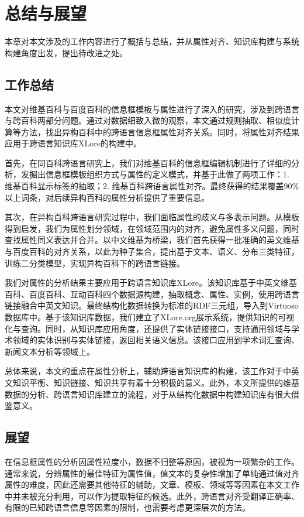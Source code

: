 \chapter{总结与展望}
\label{cha:conclusion}
本章对本文涉及的工作内容进行了概括与总结，并从属性对齐、知识库构建与系统构建角度出发，提出待改进之处。

\section{工作总结}
本文对维基百科与百度百科的信息框模板与属性进行了深入的研究，涉及到跨语言与跨百科两部分问题。通过对数据细致入微的观察，本文通过规则抽取、相似度计算等方法，找出异构百科中的跨语言信息框属性对齐关系。同时，将属性对齐结果应用于跨语言知识库XLore的构建中。

首先，在同百科跨语言研究上，我们对维基百科的信息框编辑机制进行了详细的分析，发掘出信息框模板组织方式与属性的定义模式，并基于此做了两项工作：1. 维基百科显示标签的抽取；2. 维基百科跨语言属性对齐。最终获得的结果覆盖90\%以上词条，对后续异构百科的属性分析提供了重要信息。

其次，在异构百科跨语言研究过程中，我们面临属性的歧义与多表示问题。从模板得到启发，我们为属性划分领域，在领域范围内的对齐，避免属性多义问题，同时查找属性同义表达并合并。以中文维基为桥梁，我们首先获得一批准确的英文维基与百度百科的对齐关系，以此为种子集合，提出基于文本、语义、分布三类特征，训练二分类模型，实现异构百科下的跨语言链接。

我们对属性的分析结果主要应用于跨语言知识库XLore。该知识库基于中英文维基百科、百度百科、互动百科四个数据源构建，抽取概念、属性、实例，使用跨语言链接融合中英文知识。最终结构化数据转换为标准的RDF三元组，导入到Virtuoso数据库中。基于该知识库数据，我们建立了XLore.org展示系统，提供知识的可视化与查询。同时，从知识库应用角度，还提供了实体链接接口，支持通用领域与学术领域的实体识别与实体链接，返回相关语义信息。该接口应用到学术词汇查询、新闻文本分析等领域上。

总体来说，本文的重点在属性分析上，辅助跨语言知识库的构建，该工作对于中英文知识平衡、知识链接、知识共享有着十分积极的意义。此外，本文所提供的维基数据的分析、跨语言知识库建立的流程，对于从结构化数据中构建知识库有很大借鉴意义。

\section{展望}
在信息框属性的分析因属性粒度小，数据不归整等原因，被视为一项繁杂的工作。通常来说，分辨属性的最佳特征为属性值，值文本的复杂性增加了单纯通过值对齐属性的难度，因此还需要其他特征的辅助，文章、模板、领域等等因素在本文工作中并未被充分利用，可以作为提取特征的候选。此外，跨语言对齐受翻译正确率、有限的已知跨语言信息等因素的限制，也需要考虑更深层次的方法。

